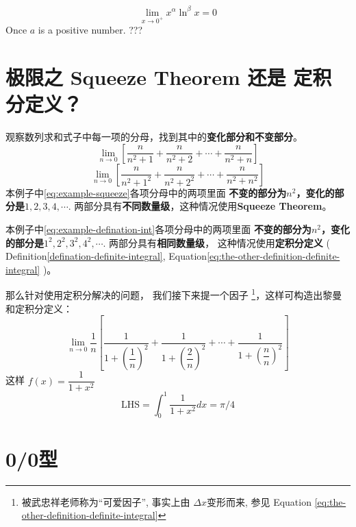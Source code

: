 \begin{lemma}
    \[
        \lim_{x \to 0^+} x^{\alpha} \ln^{\beta}x = 0
    \]
    Once $a$ is a positive number. ??? %
\end{lemma}

\section{极限之 Squeeze Theorem 还是 定积分定义？}
\label{use-squeeze-or-definition-of-integral}

观察数列求和式子中每一项的分母，找到其中的\textbf{变化部分和不变部分}。
\begin{equation} \label{eq:example-squeeze}
	\lim_{n \to 0} \left[ 
	\dfrac{n}{n^2+1} + \dfrac{n}{n^2+2} + \cdots + \dfrac{n}{n^2+n} 
	\right]  
\end{equation}
\begin{equation} \label{eq:example-defination-int}
	\lim_{n \to 0} \left[ 
	\dfrac{n}{n^2+1^2} + \dfrac{n}{n^2+2^2} + \cdots + \dfrac{n}{n^2+n^2} 
	\right]  
\end{equation}
本例子中\ref{eq:example-squeeze}各项分母中的两项里面
\textbf{不变的部分为$n^2$，变化的部分是$1,2,3,4,\cdots$}.
两部分具有\textbf{不同数量级}，这种情况使用\textbf{Squeeze Theorem}。

本例子中\ref{eq:example-defination-int}各项分母中的两项里面
\textbf{不变的部分为$n^2$，变化的部分是$1^2,2^2,3^2,4^2,\cdots$}.
两部分具有\textbf{相同数量级}，
这种情况使用\textbf{定积分定义}
(
    Definition\ref{defination-definite-integral}, 
    Equation\ref{eq:the-other-definition-definite-integral}
)。

那么针对使用定积分解决的问题，
我们接下来提一个因子
\footnote{
    被武忠祥老师称为“可爱因子”, 事实上由 
    $\Delta x$变形而来, 
    参见 Equation \ref{eq:the-other-definition-definite-integral}
}，这样可构造出黎曼和定积分定义：
\begin{equation*}
	\lim_{n \to 0} \dfrac{1}{n} \left[ 
	\dfrac{1}{1+\left(\dfrac{1}{n}\right)^2} + 
	\dfrac{1}{1+\left(\dfrac{2}{n}\right)^2} + \cdots + 
	\dfrac{1}{1+\left(\dfrac{n}{n}\right)^2}
	\right]  
\end{equation*}
这样 $f(x) = \dfrac{1}{1+x^2}$
\begin{equation*}
	\mbox{LHS} = \int_{0}^{1} \dfrac{1}{1+x^2} dx = \pi / 4
\end{equation*}

\section{0/0型}
